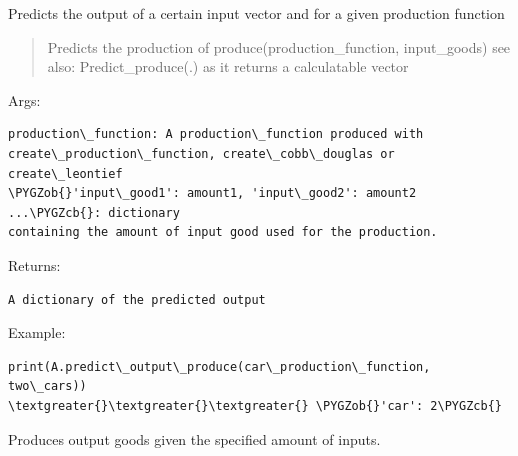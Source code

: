 \documentclass[letterpaper,10pt,english]{sphinxmanual}
\def\PYGZob{\char`\{}
\def\PYGZcb{\char`\}}
\begin{document}
\begin{fulllineitems}
\begin{fulllineitems}
\end{fulllineitems}


\begin{fulllineitems}
\label{FirmMultiTechnologies:abce.FirmMultiTechnologies.predict_produce_output}
Predicts the output of a certain input vector and for a given
production function
\begin{quote}

Predicts the production of produce(production\_function, input\_goods)
see also: Predict\_produce(.) as it returns a calculatable vector
\end{quote}

Args:

\begin{Verbatim}[commandchars=\\\{\}]
production\_function: A production\_function produced with
create\_production\_function, create\_cobb\_douglas or create\_leontief
\PYGZob{}'input\_good1': amount1, 'input\_good2': amount2 ...\PYGZcb{}: dictionary
containing the amount of input good used for the production.
\end{Verbatim}

Returns:

\begin{Verbatim}[commandchars=\\\{\}]
A dictionary of the predicted output
\end{Verbatim}

Example:

\begin{Verbatim}[commandchars=\\\{\}]
print(A.predict\_output\_produce(car\_production\_function, two\_cars))
\textgreater{}\textgreater{}\textgreater{} \PYGZob{}'car': 2\PYGZcb{}
\end{Verbatim}

\end{fulllineitems}


\begin{fulllineitems}
\label{FirmMultiTechnologies:abce.FirmMultiTechnologies.produce}
Produces output goods given the specified amount of inputs.


\end{fulllineitems}
\end{fulllineitems}
\end{document}
